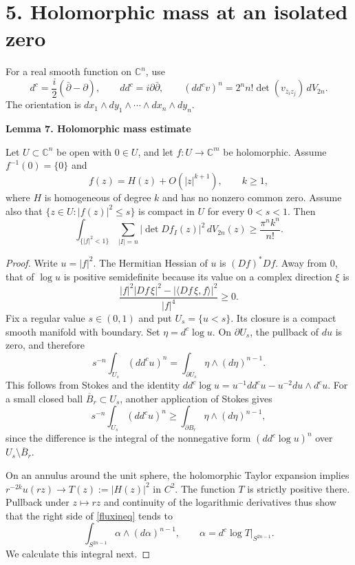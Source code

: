 \documentclass[11pt,a4paper]{article}
\newenvironment{statement}[1]{\begin{tcolorbox}[proofbox]\textbf{#1}\par\smallskip}{\end{tcolorbox}}
\newcommand{\C}{\mathbb C}
\newcommand{\sect}[1]{\section*{#1}}
\begin{document}
\newpage
\sect{5. Holomorphic mass at an isolated zero}
For a real smooth function on $\C^n$, use
\[
 d^c=\frac i2(\bar\partial-\partial),\qquad
 dd^c=i\partial\bar\partial,\qquad
 (dd^cv)^n=2^n n!\det(v_{\bar z_i z_j})\,dV_{2n}.
\]
The orientation is $dx_1\wedge dy_1\wedge\cdots\wedge dx_n\wedge dy_n$.

\begin{statement}{Lemma 7. Holomorphic mass estimate}
Let $U\subset\C^n$ be open with $0\in U$, and let
$f:U\to\C^m$ be holomorphic. Assume $f^{-1}(0)=\{0\}$ and
\[
 f(z)=H(z)+O(|z|^{k+1}),\qquad k\geq1,
\]
where $H$ is homogeneous of degree $k$ and has no nonzero common zero.
Assume also that $\{z\in U:|f(z)|^2\leq s\}$ is compact in $U$ for
every $0<s<1$. Then
\begin{equation}\label{mass}
 \int_{\{|f|^2<1\}}\sum_{|I|=n}|\det Df_I(z)|^2\,dV_{2n}(z)
 \geq\frac{\pi^n k^n}{n!}.
\end{equation}
\end{statement}
\begin{proof}
Write $u=|f|^2$. The Hermitian Hessian of $u$ is $(Df)^*Df$. Away
from $0$, that of $\log u$ is positive semidefinite because its value
on a complex direction $\xi$ is
\[
 \frac{|f|^2|Df\,\xi|^2-|\langle Df\,\xi,f\rangle|^2}{|f|^4}\geq0.
\]
Fix a regular value $s\in(0,1)$ and put $U_s=\{u<s\}$. Its closure
is a compact smooth manifold with boundary. Set $\eta=d^c\log u$.
On $\partial U_s$, the pullback of $du$ is zero, and therefore
\[
 s^{-n}\int_{U_s}(dd^cu)^n
 =\int_{\partial U_s}\eta\wedge(d\eta)^{n-1}.
\]
This follows from Stokes and the identity
$dd^c\log u=u^{-1}dd^cu-u^{-2}du\wedge d^cu$.
For a small closed ball $\overline B_r\subset U_s$, another application
of Stokes gives
\begin{equation}\label{fluxineq}
 s^{-n}\int_{U_s}(dd^cu)^n
 \geq\int_{\partial B_r}\eta\wedge(d\eta)^{n-1},
\end{equation}
since the difference is the integral of the nonnegative form
$(dd^c\log u)^n$ over $U_s\setminus\overline B_r$.

On an annulus around the unit sphere, the holomorphic Taylor expansion
implies $r^{-2k}u(rz)\to T(z):=|H(z)|^2$ in $C^2$. The function $T$
is strictly positive there. Pullback under $z\mapsto rz$ and continuity
of the logarithmic derivatives thus show that the right side of
\eqref{fluxineq} tends to
\[
 \int_{S^{2n-1}}\alpha\wedge(d\alpha)^{n-1},\qquad
 \alpha=d^c\log T\big|_{S^{2n-1}}.
\]
We calculate this integral next.
\renewcommand{\qedsymbol}{}
\end{proof}
\end{document}
